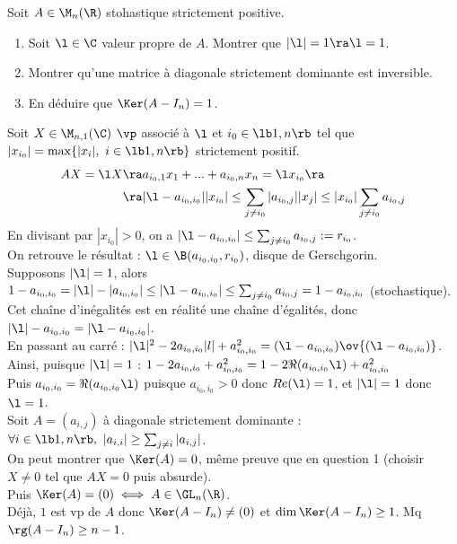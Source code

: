 \documentclass[11pt]{article}
\begin{document}
\begin{exercice}{}{}
    Soit $A\in\M_n(\R)$ stohastique strictement positive.
    \begin{enumerate}
        \item Soit $\l\in\C$ valeur propre de $A$. Montrer que $|\l|=1\ra \l=1$.
        \item Montrer qu'une matrice à diagonale strictement dominante est inversible.
        \item En déduire que $\Ker(A-I_n) = 1$.
    \end{enumerate}
    \tcblower
     Soit $X\in\M_{n,1}(\C)$ $\vp$ associé à $\l$ et $i_0\in\lb1,n\rb$ tel que $|x_{i_0}|=\max\{|x_i|, ~ i\in\lb1,n\rb\}$ strictement positif.
    \begin{align*}
        AX=\l X &\ra a_{i_0,1}x_1 + ... + a_{i_0,n}x_n = \l x_{i_0} \ra\\
        &\ra |\l-a_{i_0,i_0}||x_{i_0}| \leq \sum_{j\neq i_0}|a_{i_0,j}||x_j| \leq |x_{i_0}|\sum_{j\neq i_0}a_{i_0,j}
    \end{align*}
    En divisant par $|x_{i_0}|>0$, on a $|\l-a_{i_0,i_0}|\leq \sum_{j\neq i_0}a_{i_0,j} := r_{i_0}$.\\
    On retrouve le résultat : $\l \in \B(a_{i_0,i_0}, r_{i_0})$, disque de Gerschgorin.\\
    Supposons $|\l|=1$, alors $1-a_{i_0,i_0}=|\l|-|a_{i_0,i_0}|\leq|\l - a_{i_0,i_0}| \leq \sum_{j\neq i_0}a_{i_0,j}=1-a_{i_0,i_0}$ (stochastique).\\
    Cet chaîne d'inégalités est en réalité une chaîne d'égalités, donc $|\l|-a_{i_0,i_0}=|\l-a_{i_0,i_0}|$.\\
    En passant au carré : $|\l|^2 - 2a_{i_0,i_0}|l|+a_{i_0,i_0}^2 = (\l-a_{i_0,i_0})\ov{(\l-a_{i_0,i_0})}$.\\
    Ainsi, puisque $|\l|=1$ : $1-2a_{i_0,i_0}+a_{i_0,i_0}^2 = 1 - 2\Re(a_{i_0,i_0}\l) + a_{i_0,i_0}^2$\\
    Puis $a_{i_0,i_0}=\Re(a_{i_0,i_0}\l)$ puisque $a_{i_0,i_0}>0$ donc $Re(\l)=1$, et $|\l|=1$ donc $\l=1$.\\
     Soit $A=(a_{i,j})$ à diagonale strictement dominante : $\forall i \in \lb1,n\rb, ~ |a_{i,i}|\geq\sum_{j\neq i}|a_{i,j}|$.\\
    On peut montrer que $\Ker(A)=0$, même preuve que en question 1 (choisir $X\neq0$ tel que $AX=0$ puis absurde).\\
    Puis $\Ker(A)=(0)\iff A\in\GL_n(\R)$.\\
     Déjà, $1$ est vp de $A$ donc $\Ker(A-I_n)\neq(0)$ et $\dim\Ker(A-I_n)\geq1$. Mq $\rg(A-I_n)\geq n-1$.

\end{exercice}
\end{document}
